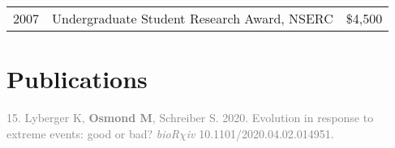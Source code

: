 \documentclass[12pt]{article}
\begin{document}
\begin{tabular}{llr}
  2007 & Undergraduate Student Research Award, NSERC & \$4,500\\
\end{tabular}

\section*{Publications}

\noindent\hspace{.1cm}\textcolor{gray}{15. Lyberger K, \textbf{Osmond M}, Schreiber S. 2020. Evolution in response to extreme events: good or bad? \textit{bioR$\chi$iv} 10.1101/2020.04.02.014951.}

\noindent{}
\end{document}
